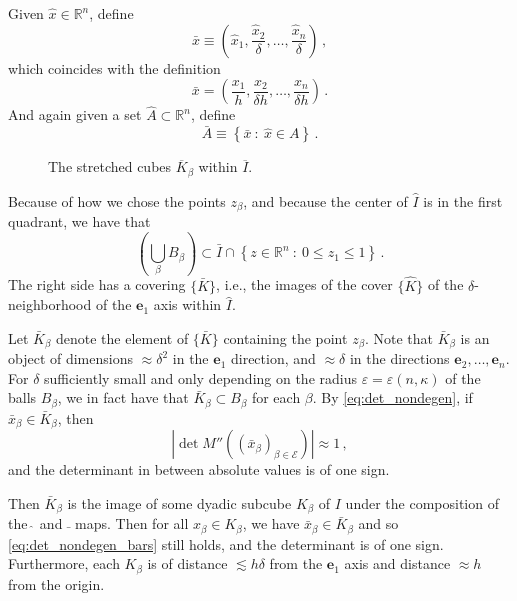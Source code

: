 \documentclass{amsart}%
\renewcommand{\hat}{\widehat}
\renewcommand{\epsilon}{\varepsilon}
\theoremstyle{plain}
\numberwithin{equation}{section}
\begin{document}
Given $\hat{x} \in \mathbb{R}^n$, define
\[
	\bar{x} \equiv \left ( \hat{x}_1, \frac{\hat{x}_2}{\delta} , \ldots, \frac{\hat{x}_n}{\delta} \right ) \, , 
\]
which coincides with the definition
\[
	\bar{x} = \left ( \frac{x_1}{h}, \frac{x_2}{ \delta h}, \ldots, \frac{x_n}{ \delta h} \right ) \, . 
\]
And again given a set $\hat{A} \subset \mathbb{R}^n$, define
\[
	\bar{A} \equiv \left \{ \bar{x} ~:~ \hat{x} \in A \right \} \, . 
\] 

\begin{figure}[ht]\label{fig:cubes_Alpert_slant_stretch}
	\caption{The stretched cubes $\overline{K}_{\beta}$ within $\overline{I}$. }
\end{figure}

Because of how we chose the points $z_{\beta}$, and because the center of $\hat{I}$ is in the first quadrant, we have that 
\[
	\left ( \bigcup\limits_{\beta} B_{\beta} \right ) \subset \bar{I} \cap \left \{z \in \mathbb{R}^n ~:~ 0 \leq z_1 \leq 1 \right \} \, . 
\]
 The right side has a covering $\{\bar{K}\}$, i.e., the images of the  cover $\{\hat{K}\}$ of the $\delta$-neighborhood of the $\mathbf{e}_1$ axis within $\hat{I}$.

Let $\bar{K}_{\beta}$ denote the element of $\{\bar{K}\}$ containing the point $z_{\beta}$. Note that $\bar{K}_{\beta}$ is an object of dimensions $\approx \delta^2$ in the $\mathbf{e}_1$ direction, and $\approx \delta$ in the directions $\mathbf{e}_2, \ldots, \mathbf{e}_n$. For $\delta$ sufficiently small and only depending on the radius $\epsilon = \epsilon (n, \kappa)$ of the balls $B_{\beta}$, we in fact have that $\bar{K}_{\beta} \subset B_{\beta}$ for each $\beta$. By \eqref{eq:det_nondegen}, if $\bar{x}_{\beta} \in \bar{K}_{\beta}$, then 
\begin{equation}\label{eq:det_nondegen_bars}
	|\det M'' ( (\bar{x}_{\beta} )_{\beta\in \mathcal{E}} ) | \approx 1 \, ,
\end{equation}
and the determinant in between absolute values is of one sign.

Then $\bar{K}_{\beta}$ is the image of some dyadic subcube $K_{\beta}$ of $I$ under the composition of the $\hat{~}$ and  $\bar{~}$ maps. Then for all $x_{\beta} \in K_{\beta}$, we have $\bar{x}_{\beta} \in \bar{K}_{\beta}$ and so \eqref{eq:det_nondegen_bars} still holds, and the determinant is of one sign. Furthermore, each $K_{\beta}$ is of distance $\lesssim h \delta$ from the $\mathbf{e}_1$ axis and distance $\approx h$ from the origin.
\end{document}
